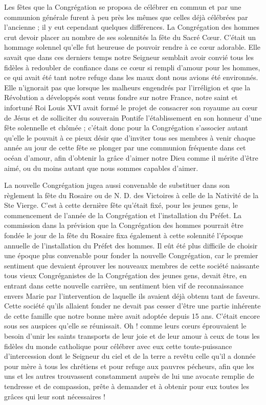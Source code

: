 Les fêtes que la Congrégation se proposa de célébrer en commun et par une communion générale furent à peu près les mêmes que celles déjà célébrées par l'ancienne ; il y eut cependant quelques différences. La Congrégation des hommes crut devoir placer au nombre de ses solennités la fête du Sacré Cœur. C'était un hommage solennel qu'elle fut heureuse de pouvoir rendre à ce cœur adorable. Elle savait que dans ces derniers temps notre Seigneur semblait avoir convié tous les fidèles à redoubler de confiance dans ce cœur si rempli d'amour pour les hommes, ce qui avait été tant notre refuge dans les maux dont nous avions été environnés. Elle n'ignorait pas que lorsque les malheurs engendrés par l'irréligion et que la Révolution a développés sont venus fondre sur notre France, notre saint et infortuné Roi Louis XVI avait formé le projet de consacrer son royaume au cœur de Jésus et de solliciter du souverain Pontife l'établissement en son honneur d'une fête solennelle et chômée ; c'était donc pour la Congrégation s'associer autant qu'elle le pouvait à ce pieux désir que d'inviter tous ses membres à venir chaque année au
jour de cette fête se plonger par une communion fréquente dans cet océan d'amour, afin d'obtenir la grâce d'aimer notre Dieu comme il mérite d'être aimé, ou du moins autant que nous sommes capables d'aimer.

La nouvelle Congrégation jugea aussi convenable de substituer dans son règlement la fête du Rosaire ou de N. D. des Victoires à celle de la Nativité de la Ste Vierge. C'est à cette dernière fête qu'était fixé, pour les jeunes gens, le commencement de l'année de la Congrégation et l'installation du Préfet. La commission dans la prévision que la Congrégation des hommes pourrait être fondée le jour de la fête du Rosaire fixa également à cette solennité l'époque annuelle de l'installation du Préfet des hommes. Il eût été plus difficile de choisir une époque plus convenable pour fonder la nouvelle Congrégation, car le premier sentiment que devaient éprouver les nouveaux membres de cette société naissante tous vieux Congréganistes de la Congrégation des jeunes gens, devait être, en entrant dans cette nouvelle carrière, un sentiment bien vif de reconnaissance envers Marie par l'intervention de laquelle ils avaient déjà obtenu tant de faveurs. Cette société qu'ils allaient fonder ne devait pas cesser d'être une partie inhérente de cette famille que notre bonne mère avait adoptée depuis 15 ans. C'était encore sous ses auspices qu'elle se réunissait. Oh ! comme leurs cœurs éprouvaient le besoin d'unir les saints transports de leur joie et de leur amour à ceux de tous les fidèles du monde catholique pour célébrer avec eux cette toute-puissance d'intercession dont le Seigneur du ciel et de la terre a revêtu celle
qu'il a donnée pour mère à tous les chrétiens et pour refuge aux pauvres pécheurs, afin que les uns et les autres trouvassent constamment auprès de lui une avocate remplie de tendresse et de compassion, prête à demander et à obtenir pour eux toutes les grâces qui leur sont nécessaires !

